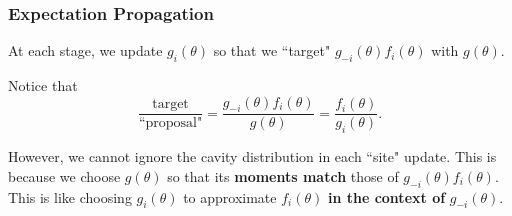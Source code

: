 \documentclass{beamer}
\begin{document}
\begin{frame}[fragile]
\frametitle{Expectation Propagation}

At each stage, we update $g_i(\theta)$ so that we ``target" $g_{-i}(\theta) f_i(\theta)$ with $g(\theta)$. 
\newline

Notice that
$$
\frac{\text{target}}{\text{``proposal"} } = \frac{g_{-i}(\theta) f_i(\theta)}{g(\theta)} = \frac{f_i(\theta)}{g_i(\theta)}.
$$

However, we cannot ignore the cavity distribution in each ``site" update. This is because we choose $g(\theta)$ so that its {\bf moments match} those of $g_{-i}(\theta) f_i(\theta)$. This is like choosing $g_i(\theta)$ to approximate $f_i(\theta)$ {\bf in the context of} $g_{-i}(\theta)$.

\end{frame}
\end{document}
